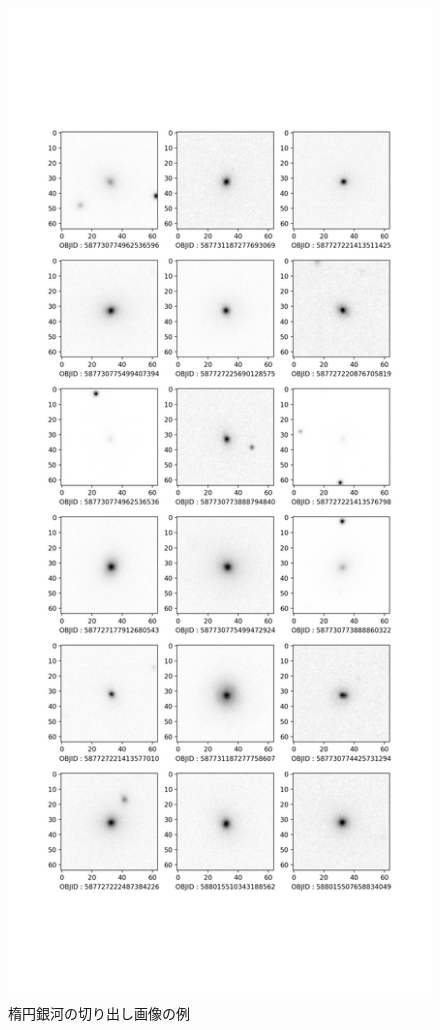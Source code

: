 \documentclass[a4j, 11pt]{jreport}
\begin{document}
\newpage
\begin{figure}[H]
  \centering
  \includegraphics[width=0.6\vsize, keepaspectratio]{images/syuron_4syou_sdss_imgs/elliptical.png}
  \caption{楕円銀河の切り出し画像の例}
  \label{fig:sdss_images_elliptical}
\end{figure}
\end{document}
